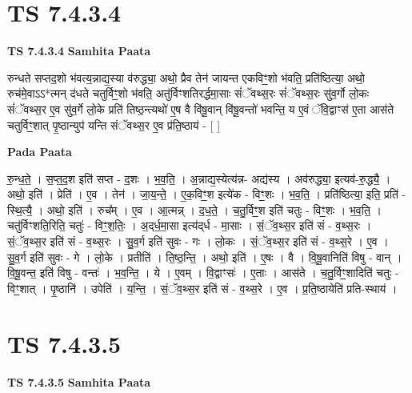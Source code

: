 \documentclass[17pt]{extarticle}
\begin{document}

\section{ TS 7.4.3.4 }

\textbf{TS 7.4.3.4 } \newline
\textbf{Samhita Paata} \newline

रुन्धते सप्तद॒शो भ॑वत्य॒न्नाद्य॒स्या व॑रुद्ध्या॒ अथो॒ प्रैव तेन॑ जायन्त एकविꣳ॒॒शो भ॑वति॒ प्रति॑ष्ठित्या॒ अथो॒ रुच॑मे॒वाऽऽ*त्मन् द॑धते चतुर्विꣳ॒॒शो भ॑वति॒ अतु॑र्विꣳशतिरर्द्धमा॒साः सं॑ॅवथ्स॒रः सं॑ॅवथ्स॒रः सु॑व॒र्गो लो॒कः सं॑ॅवथ्स॒र ए॒व सु॑व॒र्गे लो॒के प्रति॑ तिष्ठ॒न्त्यथो॑ ए॒ष वै वि॑षू॒वान् वि॑षू॒वन्तो॑ भवन्ति॒ य ए॒वं ॅवि॒द्वाꣳस॑ ए॒ता आस॑ते चतुर्विꣳ॒॒शात् पृ॒ष्ठान्युप॑ यन्ति संॅवथ्स॒र ए॒व प्र॑ति॒ष्ठाय॑ - [  ] \newline

\textbf{Pada Paata} \newline

रु॒न्ध॒ते॒ । स॒प्त॒द॒श इति॑ सप्त - द॒शः । भ॒व॒ति॒ । अ॒न्नाद्य॒स्येत्य॑न्न- अद्य॑स्य । अव॑रुद्ध्या॒ इत्यव॑-रु॒द्ध्यै॒ । अथो॒ इति॑ । प्रेति॑ । ए॒व । तेन॑ । जा॒य॒न्ते॒ । ए॒क॒विꣳ॒॒श इत्ये॑क - विꣳ॒॒शः । भ॒व॒ति॒ । प्रति॑ष्ठित्या॒ इति॒ प्रति॑ - स्थि॒त्यै॒ । अथो॒ इति॑ । रुच᳚म् । ए॒व । आ॒त्मन्न् । द॒ध॒ते॒ । च॒तु॒र्विꣳ॒॒श इति॑ चतुः - विꣳ॒॒शः । भ॒व॒ति॒ । चतु॑र्विꣳशति॒रिति॒ चतुः॑ - विꣳ॒॒श॒तिः॒ । अ॒द्‌र्ध॒मा॒सा इत्य॑द्‌र्ध - मा॒साः । सं॒ॅव॒थ्स॒र इति॑ सं - व॒थ्स॒रः । सं॒ॅव॒थ्स॒र इति॑ सं - व॒थ्स॒रः । सु॒व॒र्ग इति॑ सुवः - गः । लो॒कः । सं॒ॅव॒थ्स॒र इति॑ सं - व॒थ्स॒रे । ए॒व । सु॒व॒र्ग इति॑ सुवः - गे । लो॒के । प्रतीति॑ । ति॒ष्ठ॒न्ति॒ । अथो॒ इति॑ । ए॒षः । वै । वि॒षू॒वानिति॑ विषु - वान् । वि॒षू॒वन्त॒ इति॑ विषु - वन्तः॑ । भ॒व॒न्ति॒ । ये । ए॒वम् । वि॒द्वाꣳसः॑ । ए॒ताः । आस॑ते । च॒तु॒र्विꣳ॒॒शादिति॑ चतुः - विꣳ॒॒शात् । पृ॒ष्ठानि॑ । उपेति॑ । य॒न्ति॒ । सं॒ॅव॒थ्स॒र इति॑ सं - व॒थ्स॒रे । ए॒व । प्र॒ति॒ष्ठायेति॑ प्रति-स्थाय॑ ।  \newline





\section{ TS 7.4.3.5 }

\textbf{TS 7.4.3.5 } \newline
\textbf{Samhita Paata} \newline
\end{document}
